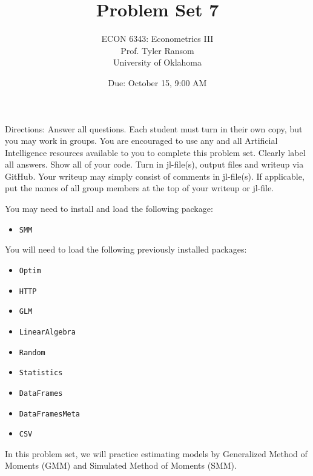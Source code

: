 \documentclass[12pt,english]{article}
\begin{document}
\title{Problem Set 7}
\author{ECON 6343: Econometrics III\\
Prof. Tyler Ransom\\
University of Oklahoma}
\date{Due: October 15, 9:00 AM}

\maketitle
Directions: Answer all questions. Each student must turn in their own copy, but you may work in groups. You are encouraged to use any and all Artificial Intelligence resources available to you to complete this problem set. Clearly label all answers. Show all of your code. Turn in jl-file(s), output files and writeup via GitHub. Your writeup may simply consist of comments in jl-file(s). If applicable, put the names of all group members at the top of your writeup or jl-file.

You may need to install and load the following package:
\begin{itemize}
 \item[~] \texttt{SMM}
\end{itemize}

You will need to load the following previously installed packages:
\begin{itemize}
    \item[~] \texttt{Optim} 
    \item[~] \texttt{HTTP} 
    \item[~] \texttt{GLM} 
    \item[~] \texttt{LinearAlgebra} 
    \item[~] \texttt{Random} 
    \item[~] \texttt{Statistics} 
    \item[~] \texttt{DataFrames} 
    \item[~] \texttt{DataFramesMeta} 
    \item[~] \texttt{CSV} 
\end{itemize}
\pagebreak
In this problem set, we will practice estimating models by Generalized Method of Moments (GMM) and Simulated Method of Moments (SMM).
\end{document}
